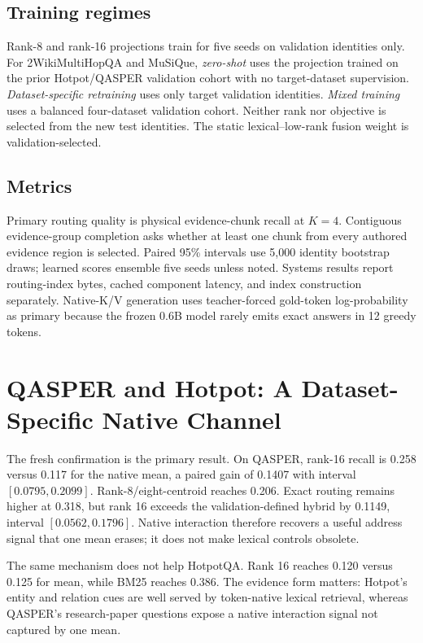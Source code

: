 \documentclass[11pt]{article}
\newcommand{\kv}{\textsc{K/V}\xspace}
\newcommand{\hotpot}{HotpotQA\xspace}
\newcommand{\qasper}{QASPER\xspace}
\newcommand{\twowiki}{2WikiMultiHopQA\xspace}
\newcommand{\musique}{MuSiQue\xspace}
\begin{document}
\subsection{Training regimes}
Rank-8 and rank-16 projections train for five seeds on validation identities
only. For \twowiki and \musique, \emph{zero-shot} uses the projection trained
on the prior Hotpot/QASPER validation cohort with no target-dataset
supervision. \emph{Dataset-specific retraining} uses only target validation
identities. \emph{Mixed training} uses a balanced four-dataset validation
cohort. Neither rank nor objective is selected from the new test identities.
The static lexical--low-rank fusion weight is validation-selected.

\subsection{Metrics}
Primary routing quality is physical evidence-chunk recall at $K=4$. Contiguous
evidence-group completion asks whether at least one chunk from every authored
evidence region is selected. Paired 95\% intervals use 5,000 identity bootstrap
draws; learned scores ensemble five seeds unless noted. Systems results report
routing-index bytes, cached component latency, and index construction
separately. Native-\kv generation uses teacher-forced gold-token log-probability
as primary because the frozen 0.6B model rarely emits exact answers in 12 greedy
tokens.

\section{QASPER and Hotpot: A Dataset-Specific Native Channel}
The fresh confirmation is the primary result. On \qasper, rank-16 recall is
0.258 versus 0.117 for the native mean, a paired gain of 0.1407 with interval
$[0.0795,0.2099]$. Rank-8/eight-centroid reaches 0.206. Exact routing remains
higher at 0.318, but rank 16 exceeds the validation-defined hybrid by 0.1149,
interval $[0.0562,0.1796]$. Native interaction therefore recovers a useful
address signal that one mean erases; it does not make lexical controls obsolete.

The same mechanism does not help \hotpot. Rank 16 reaches 0.120 versus 0.125
for mean, while BM25 reaches 0.386. The evidence form matters: Hotpot's entity
and relation cues are well served by token-native lexical retrieval, whereas
QASPER's research-paper questions expose a native interaction signal not
captured by one mean.
\end{document}
